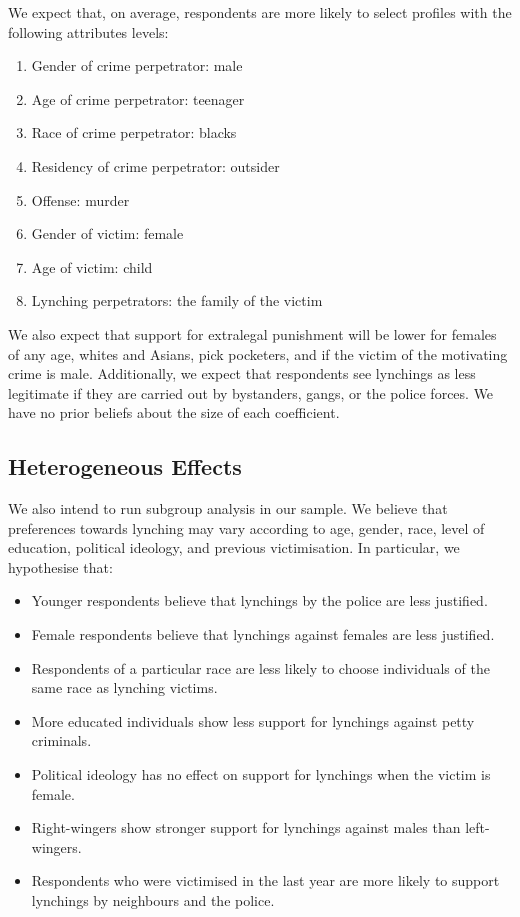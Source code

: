 \documentclass[12pt,a4paper,]{article}
\providecommand{\tightlist}{%
   \setlength{\itemsep}{0pt}\setlength{\parskip}{0pt}}
\begin{document}
\label{sec:hypotheses}

We expect that, on average, respondents are more likely to select
profiles with the following attributes levels:

\begin{enumerate}
\def\labelenumi{\arabic{enumi})}
\tightlist
\item
  Gender of crime perpetrator: male
\item
  Age of crime perpetrator: teenager
\item
  Race of crime perpetrator: blacks
\item
  Residency of crime perpetrator: outsider
\item
  Offense: murder
\item
  Gender of victim: female
\item
  Age of victim: child
\item
  Lynching perpetrators: the family of the victim
\end{enumerate}

We also expect that support for extralegal punishment will be lower for
females of any age, whites and Asians, pick pocketers, and if the victim
of the motivating crime is male. Additionally, we expect that
respondents see lynchings as less legitimate if they are carried out by
bystanders, gangs, or the police forces. We have no prior beliefs about
the size of each coefficient.

\hypertarget{heterogeneous-effects}{%
\subsection{Heterogeneous Effects}\label{heterogeneous-effects}}

\label{sub:het01}

We also intend to run subgroup analysis in our sample. We believe that
preferences towards lynching may vary according to age, gender, race,
level of education, political ideology, and previous victimisation. In
particular, we hypothesise that:

\begin{itemize}
\item
  Younger respondents believe that lynchings by the police are less
  justified.
\item
  Female respondents believe that lynchings against females are less
  justified.
\item
  Respondents of a particular race are less likely to choose individuals
  of the same race as lynching victims.
\item
  More educated individuals show less support for lynchings against
  petty criminals.
\item
  Political ideology has no effect on support for lynchings when the
  victim is female.
\item
  Right-wingers show stronger support for lynchings against males than
  left-wingers.
\item
  Respondents who were victimised in the last year are more likely to
  support lynchings by neighbours and the police.
\end{itemize}
\end{document}
